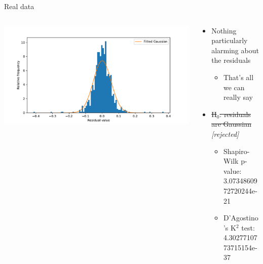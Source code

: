 \documentclass[presentation]{beamer}
\begin{document}
\begin{frame}[label={sec:org5f5781c}]{Real data}
\begin{columns}
\begin{column}{0.5\columnwidth}
\begin{center}
\includegraphics[width=\textwidth]{./hist.pdf}
\end{center}
\end{column}

\begin{column}{0.5\columnwidth}
\begin{itemize}
\item Nothing particularly alarming about the residuals
\begin{itemize}
\item That's all we can really say
\end{itemize}
\item \sout{H\(_{\text{0}}\): residuals are Gaussian} \emph{\alert{[rejected]}}
\begin{itemize}
\item Shapiro-Wilk p-value: 3.0734860972720244e-21
\item D'Agostino's K\(^{\text{2}}\) test: 4.3027710773715154e-37
\end{itemize}
\end{itemize}
\end{column}
\end{columns}
\end{frame}
\end{document}

